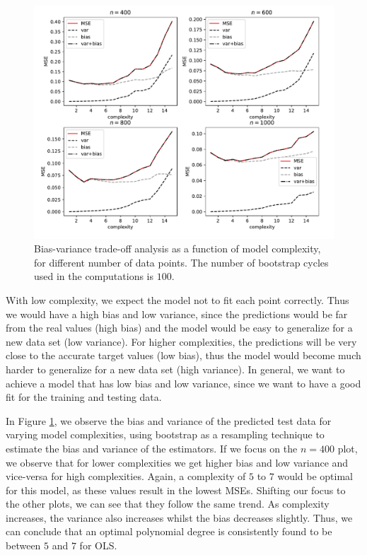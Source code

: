 \documentclass[10pt, a4paper]{article}
\begin{document}
    \begin{figure}[h]
        \centering
        \includegraphics[scale=0.65]{ex2_bias_var_bsc_100_noise_0.25.pdf}
        \caption{Bias-variance trade-off analysis as a function of model complexity, for different number of data points. The number of bootstrap cycles used in the computations is $100$.}
        \label{fig:bv_ols_bs}
    \end{figure}
    
    With low complexity, we expect the model not to fit each point correctly. Thus we would have a high bias and low variance, since the predictions would be far from the real values (high bias) and the model would be easy to generalize for a new data set (low variance). For higher complexities, the predictions will be very close to the accurate target values (low bias), thus the model would become much harder to generalize for a new data set (high variance). In general, we want to achieve a model that has low bias and low variance, since we want to have a good fit for the training and testing data.
    
    In Figure \ref{fig:bv_ols_bs}, we observe the bias and variance of the predicted test data for varying model complexities, using bootstrap as a resampling technique to estimate the bias and variance of the estimators. If we focus on the $n=400$ plot, we observe that for lower complexities we get higher bias and low variance and vice-versa for high complexities. Again, a complexity of $5$ to $7$ would be optimal for this model, as these values result in the lowest MSEs. Shifting our focus to the other plots, we can see that they follow the same trend. As complexity increases, the variance also increases whilst the bias decreases slightly. Thus, we can conclude that an optimal polynomial degree is consistently found to be between $5$ and $7$ for OLS.
    
\end{document}

